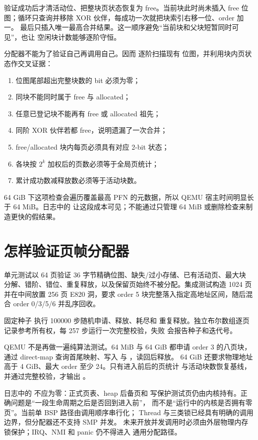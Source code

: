 验证成功后才清活动位、把整块页状态恢复为 free。当前块此时尚未插入 free
位图；循环只查询并移除 XOR 伙伴，每成功一次就把块索引右移一位、order 加一。
最后只插入唯一最高合并结果。这一顺序避免“当前块和父块短暂同时可见”，也让
空闲块计数能够逐阶守恒。

分配器不能为了验证自己再调用自己。因而  逐阶扫描现有
位图，并利用块内页状态作交叉证据：

\begin{enumerate}
  \item 位图尾部超出完整块数的 bit 必须为零；
  \item 同块不能同时属于 free 与 allocated；
  \item 任意已登记块不能再有 free 或 allocated 祖先；
  \item 同阶 XOR 伙伴若都 free，说明遗漏了一次合并；
  \item free/allocated 块内每页必须具有对应 2-bit 状态；
  \item 各块按 \(2^k\) 加权后的页数必须等于全局页统计；
  \item 累计成功数减释放数必须等于活动块数。
\end{enumerate}

64 GiB 下这项检查会遍历覆盖最高 PFN 的元数据，所以 QEMU 宿主时间明显长于
64 MiB。日志中的 \code{[QEMU][T+......ms]} 让这段成本可见；不能通过只管理
64 MiB 或删除检查来制造更快的假结果。

\section{怎样验证页帧分配器}
单元测试以 64 页验证 36 字节精确位图、缺失/过小存储、已有活动页、最大块
分解、错阶、错位、重复释放，以及保留页始终不被分配。集成测试构造 1024 页并在中间放置
256 页 E820 洞，要求 order 5 块完整落入指定高地址区间，随后混合 order
0/3/5/6 并乱序回收。

固定种子  执行 100000 步随机申请、释放、耗尽和
重复释放。独立布尔数组逐页记录参考所有权，每 257 步运行一次完整校验，失败
会报告种子和迭代号。

QEMU 不是再做一遍纯算法测试。64 MiB 与 64 GiB 都申请 order 3 的八页块，
通过 direct-map 查询首尾映射、写入
 与 ，读回后释放。
64 GiB 还要求物理地址高于 4 GiB、最大 order 至少 24。只有进入前后的页统计
与活动块数恢复基线，并通过完整校验，才输出
。

日志中的  不应为零：正式页表、heap 后备页和
写保护测试页仍由内核持有。正确问题是“一段生命周期之后是否回到进入前”，
而不是“运行中的内核是否拥有零页”。当前单 BSP 路径由调用顺序串行化；
Thread 与三类锁已经具有明确的调用边界，但分配器还不支持 SMP 并发。
未来开放并发调用时必须由外层物理内存锁保护；IRQ、NMI 和 panic 仍不得进入
通用分配路径。
